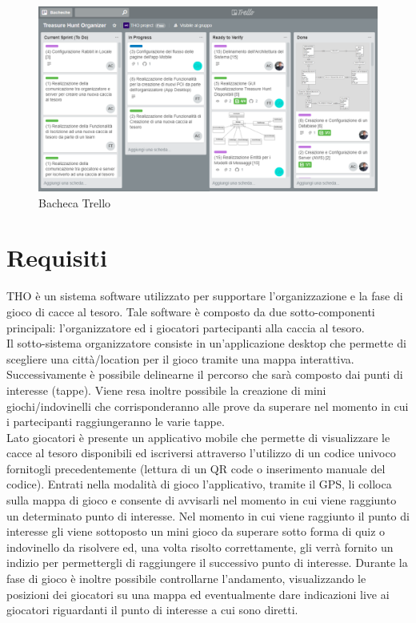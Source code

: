 \documentclass[12pt, italian]{article}
\begin{document}
\begin{figure}[H]
    \centering
    \includegraphics[width=1\textwidth]{img/trello01.png}
    \caption{Bacheca Trello}
\end{figure}

\newpage
\section{Requisiti}
THO è un sistema software utilizzato per supportare l'organizzazione e la fase di gioco di cacce al tesoro. Tale software è composto da due sotto-componenti principali: l'organizzatore ed i giocatori partecipanti alla caccia al tesoro.\\
Il sotto-sistema organizzatore consiste in un'applicazione desktop che permette di scegliere una città/location per il gioco tramite una mappa interattiva. Successivamente è possibile delinearne il percorso che sarà composto dai punti di interesse (tappe). Viene resa inoltre possibile la creazione di mini giochi/indovinelli che corrisponderanno alle prove da superare nel momento in cui i partecipanti raggiungeranno le varie tappe.\\
Lato giocatori è presente un applicativo mobile che permette di visualizzare le cacce al tesoro disponibili ed iscriversi attraverso l'utilizzo di un codice univoco fornitogli precedentemente (lettura di un QR code o inserimento manuale del codice). Entrati nella modalità di gioco l'applicativo, tramite il GPS, li colloca sulla mappa di gioco e consente di avvisarli nel momento in cui viene raggiunto un determinato punto di interesse. Nel momento in cui viene raggiunto il punto di interesse gli viene sottoposto un mini gioco da superare sotto forma di quiz o indovinello da risolvere ed, una volta risolto correttamente, gli verrà fornito un indizio per permettergli di raggiungere il successivo punto di interesse.
Durante la fase di gioco è inoltre possibile controllarne l'andamento, visualizzando le posizioni dei giocatori su una mappa ed eventualmente dare indicazioni live ai giocatori riguardanti il punto di interesse a cui sono diretti.\\
\end{document}
